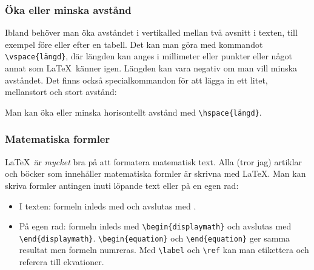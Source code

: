 
\begin{frame}[fragile=singleslide]
\frametitle{Öka eller minska avstånd}
Ibland behöver man öka avståndet i vertikalled mellan två avsnitt i texten, till exempel före eller efter en tabell. Det kan man göra med kommandot \verb/\vspace{längd}/, där längden kan anges i millimeter eller punkter eller något annat som \LaTeX\ känner igen. Längden kan vara negativ om man vill minska avståndet. Det finns också specialkommandon för att lägga in ett litet, mellanstort och stort avstånd:

\begin{Code}
\smallskip  \medskip  \bigskip
\end{Code}

Man kan öka eller minska horisontellt avstånd med \verb/\hspace{längd}/.
\end{frame} 

\begin{frame}[fragile=singleslide]
\frametitle{Matematiska formler}
\LaTeX\ är \emph{mycket} bra på att formatera matematisk text. 
Alla (tror jag) artiklar och böcker som innehåller matematiska formler 
är skrivna med \LaTeX. Man kan skriva
formler antingen inuti löpande text eller på en egen rad:
\begin{itemize}
\item I texten: formeln inleds med \code{\$} och avslutas med \code{\$}.
\item På egen rad: formeln inleds med \verb+\begin{displaymath}+
och avslutas med \verb+\end{displaymath}+.
\verb+\begin{equation}+ och \verb+\end{equation}+ ger samma
resultat men formeln numreras. Med \verb+\label+ och \verb+\ref+
kan man etikettera och referera till ekvationer.
\end{itemize}
\end{frame} 

